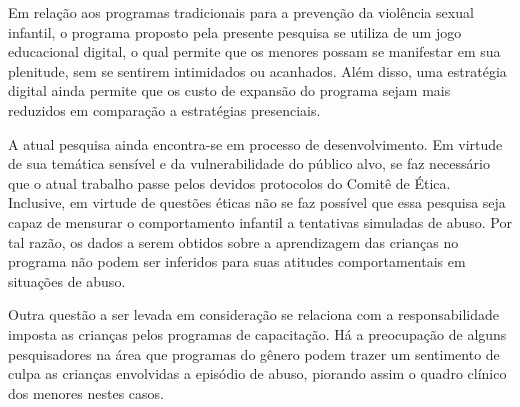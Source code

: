 Em relação aos programas tradicionais para a prevenção da violência sexual infantil, o programa proposto pela presente pesquisa se utiliza de um jogo educacional digital, o qual permite que os menores possam se manifestar em sua plenitude, sem se sentirem intimidados ou acanhados. 
Além disso, uma estratégia digital ainda permite que os custo de expansão do programa sejam mais reduzidos em comparação a estratégias presenciais. 




A atual pesquisa ainda encontra-se em processo de desenvolvimento. Em virtude de sua temática sensível e da vulnerabilidade do público alvo, se faz necessário que o atual trabalho passe pelos devidos protocolos do Comitê de Ética. Inclusive, em virtude de questões éticas não se faz possível que essa pesquisa seja capaz de mensurar o comportamento infantil a tentativas simuladas de abuso. Por tal razão, os dados a serem obtidos sobre a aprendizagem das crianças no programa não podem ser inferidos para suas atitudes comportamentais em situações de abuso. 

\pagebreak

Outra questão a ser levada em consideração se relaciona com a responsabilidade imposta as crianças pelos programas de capacitação. Há a preocupação de alguns pesquisadores na área que programas do gênero podem trazer um sentimento de culpa as crianças envolvidas a episódio de abuso, piorando assim o quadro clínico dos menores nestes casos. 





